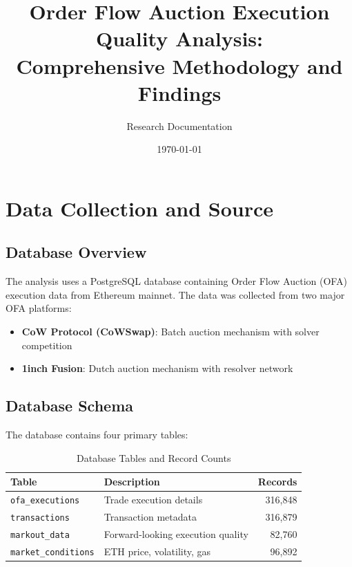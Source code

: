 \documentclass[11pt,a4paper]{article}
\title{\textbf{Order Flow Auction Execution Quality Analysis:\\Comprehensive Methodology and Findings}}
\author{Research Documentation}
\date{\today}
\begin{document}
\maketitle
\tableofcontents
\newpage

\section{Data Collection and Source}

\subsection{Database Overview}

The analysis uses a PostgreSQL database containing Order Flow Auction (OFA) execution data from Ethereum mainnet. The data was collected from two major OFA platforms:

\begin{itemize}
    \item \textbf{CoW Protocol (CoWSwap)}: Batch auction mechanism with solver competition
    \item \textbf{1inch Fusion}: Dutch auction mechanism with resolver network
\end{itemize}

\subsection{Database Schema}

The database contains four primary tables:

\begin{table}[H]
\centering
\caption{Database Tables and Record Counts}
\begin{tabular}{llr}
\toprule
\textbf{Table} & \textbf{Description} & \textbf{Records} \\
\midrule
\texttt{ofa\_executions} & Trade execution details & 316,848 \\
\texttt{transactions} & Transaction metadata & 316,879 \\
\texttt{markout\_data} & Forward-looking execution quality & 82,760 \\
\texttt{market\_conditions} & ETH price, volatility, gas & 96,892 \\
\bottomrule
\end{tabular}
\end{table}
\end{document}
